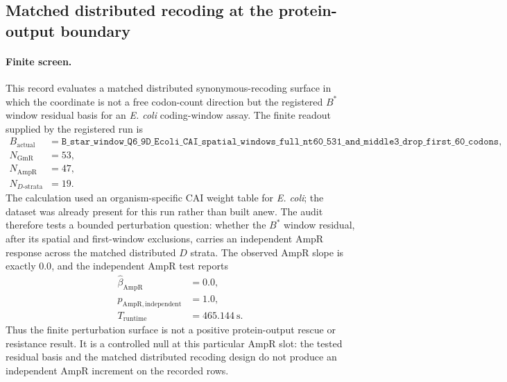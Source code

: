 \subsection{Matched distributed recoding at the protein-output boundary}\label{sec:bioreality-chen2026-matched-d-distributed-recoding}

\paragraph{Finite screen.}
This record evaluates a matched distributed synonymous-recoding surface in which the coordinate is not a free codon-count direction but the registered $B^\ast$ window residual basis for an \emph{E. coli} coding-window assay.  The finite readout supplied by the registered run is
$$
\begin{aligned}
B_{\mathrm{actual}} &= \texttt{B\_star\_window\_Q6\_9D\_Ecoli\_CAI\_spatial\_windows\_full\_nt60\_531\_and\_middle3\_drop\_first\_60\_codons},\\
N_{\mathrm{GmR}} &= 53,\\
N_{\mathrm{AmpR}} &= 47,\\
N_{D\text{-strata}} &= 19.
\end{aligned}
$$
The calculation used an organism-specific CAI weight table for \emph{E. coli}; the dataset was already present for this run rather than built anew.  The audit therefore tests a bounded perturbation question: whether the $B^\ast$ window residual, after its spatial and first-window exclusions, carries an independent AmpR response across the matched distributed $D$ strata.  The observed AmpR slope is exactly $0.0$, and the independent AmpR test reports
$$
\begin{aligned}
\widehat\beta_{\mathrm{AmpR}} &= 0.0,\\
p_{\mathrm{AmpR,independent}} &= 1.0,\\
T_{\mathrm{runtime}} &= 465.144\ \mathrm{s}.
\end{aligned}
$$
Thus the finite perturbation surface is not a positive protein-output rescue or resistance result.  It is a controlled null at this particular AmpR slot: the tested residual basis and the matched distributed recoding design do not produce an independent AmpR increment on the recorded rows.

